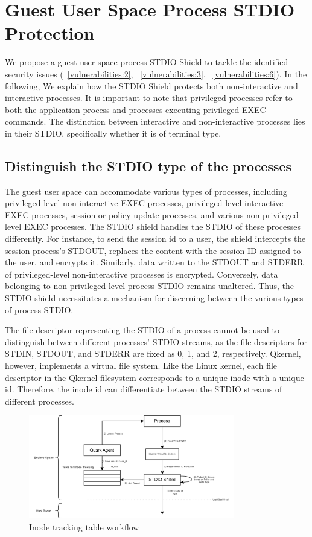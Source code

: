 \section{Guest User Space Process STDIO Protection}
\label{sec:design_STDIO_PROTECTION}
We propose a guest user-space process STDIO Shield to tackle the identified security issues (~\ref{vulnerabilities:2}, ~\ref{vulnerabilities:3}, ~\ref{vulnerabilities:6}). In the following, We explain how the STDIO Shield protects both non-interactive and interactive processes. It is important to note that privileged processes refer to 
both the application process and processes executing privileged EXEC commands. The distinction between interactive and non-interactive processes lies in their STDIO, specifically whether it is of terminal type. 


\subsection{Distinguish the STDIO type of the processes}
\label{sec:design_Distinguish_io}

The guest user space can accommodate various types of processes, including privileged-level non-interactive EXEC processes, privileged-level interactive EXEC processes, session or policy update processes, and various non-privileged-level EXEC processes. The STDIO shield handles the STDIO of these processes differently. For instance, 
to send the session id to a user, the shield intercepts the session process's STDOUT, replaces the content with the session ID assigned to the user, and encrypts it. Similarly, data written to the STDOUT and STDERR of privileged-level non-interactive processes is encrypted. Conversely, data belonging 
to non-privileged level process STDIO remains unaltered. Thus, the STDIO shield necessitates a mechanism for discerning between the various types of process STDIO.
 
The file descriptor representing the STDIO of a process cannot be used to distinguish between different processes' STDIO streams, as the file descriptors for STDIN, STDOUT, and STDERR are fixed as 0, 1, and 2, respectively. Qkernel, however, implements a virtual file system. Like the Linux kernel, each file descriptor in the Qkernel filesystem corresponds to 
a unique inode with a unique id. Therefore, the inode id can differentiate between the STDIO streams of different processes.
\begin{figure}[!htb]
    \centering
    \includegraphics[width=0.8\textwidth]{images/differenciate_fds.png}
    \caption[Inode tracking table workflow]{Inode tracking table workflow}
    \label{fig:differenciate_fds}
\end{figure}
 

